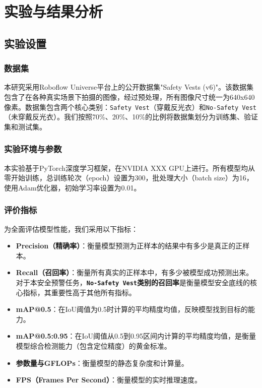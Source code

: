 \documentclass[a4paper]{ctexart}
\begin{document}
\section{实验与结果分析}

\subsection{实验设置}
\subsubsection{数据集}
本研究采用Roboflow Universe平台上的公开数据集"Safety Vests (v6)"。该数据集包含了在各种真实场景下拍摄的图像，经过预处理，所有图像尺寸统一为640x640像素。数据集包含两个核心类别：\texttt{Safety Vest}（穿戴反光衣）和\texttt{No-Safety Vest}（未穿戴反光衣）。我们按照70\%、20\%、10\%的比例将数据集划分为训练集、验证集和测试集。

\subsubsection{实验环境与参数}
本实验基于PyTorch深度学习框架，在NVIDIA XXX GPU上进行。所有模型均从零开始训练，总训练轮次（epoch）设置为300，批处理大小（batch size）为16，使用Adam优化器，初始学习率设置为0.01。

\subsubsection{评价指标}
为全面评估模型性能，我们采用以下指标：
\begin{itemize}
    \item \textbf{Precision（精确率）}：衡量模型预测为正样本的结果中有多少是真正的正样本。
    \item \textbf{Recall（召回率）}：衡量所有真实的正样本中，有多少被模型成功预测出来。对于本安全预警任务，\textbf{\texttt{No-Safety Vest}类别的召回率}是衡量模型安全底线的核心指标，其重要性高于其他所有指标。
    \item \textbf{mAP@0.5}：在IoU阈值为0.5时计算的平均精度均值，反映模型找到目标的能力。
    \item \textbf{mAP@0.5:0.95}：在IoU阈值从0.5到0.95区间内计算的平均精度均值，是衡量模型综合检测能力（包含定位精度）的黄金标准。
    \item \textbf{参数量与GFLOPs}：衡量模型的静态复杂度和计算量。
    \item \textbf{FPS（Frames Per Second）}：衡量模型的实时推理速度。
\end{itemize}
\end{document}
